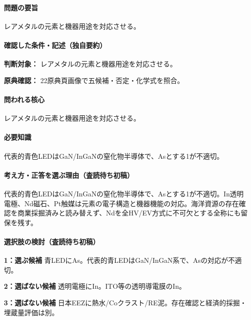 \paragraph{問題の要旨} レアメタルの元素と機器用途を対応させる。

\paragraph{確認した条件・記述（独自要約）}\mbox{}\par

\noindent\textbf{判断対象：} レアメタルの元素と機器用途を対応させる。\par

\noindent\textbf{原典確認：} 22原典頁画像で五候補・否定・化学式を照合。\par

\paragraph{問われる核心} レアメタルの元素と機器用途を対応させる。

\paragraph{必要知識} 代表的青色LEDはGaN/InGaNの窒化物半導体で、Asとする1が不適切。

\paragraph{考え方・正答を選ぶ理由（査読待ち初稿）} 代表的青色LEDはGaN/InGaNの窒化物半導体で、Asとする1が不適切。In透明電極、Nd磁石、Pt触媒は元素の電子構造と機器機能の対応。海洋資源の存在確認を商業採掘済みと読み替えず、Ndを全HV/EV方式に不可欠とする全称にも留保を残す。

\paragraph{選択肢の検討（査読待ち初稿）}\mbox{}\par

\noindent\textbf{1：選ぶ候補} 青LEDにAs。代表的青LEDはGaN/InGaN系で、Asの対応が不適切。\par

\noindent\textbf{2：選ばない候補} 透明電極にIn。ITO等の透明導電膜のIn。\par

\noindent\textbf{3：選ばない候補} 日本EEZに熱水/Coクラスト/RE泥。存在確認と経済的採掘・埋蔵量評価は別。\par

